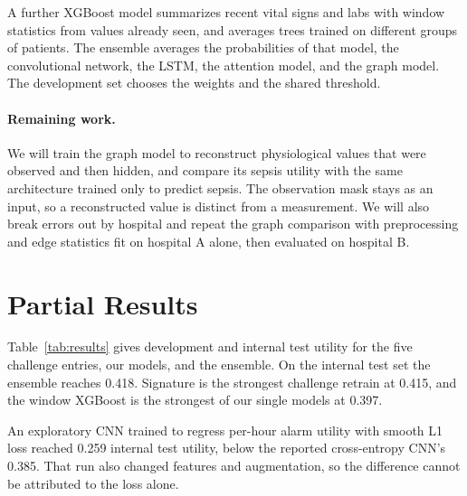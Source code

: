 \documentclass{article}
\begin{document}
A further XGBoost model summarizes recent vital signs and labs with window statistics from values already seen, and averages trees trained on different groups of patients. The ensemble averages the probabilities of that model, the convolutional network, the LSTM, the attention model, and the graph model. The development set chooses the weights and the shared threshold.

\paragraph{Remaining work.}
We will train the graph model to reconstruct physiological values that were observed and then hidden, and compare its sepsis utility with the same architecture trained only to predict sepsis. The observation mask stays as an input, so a reconstructed value is distinct from a measurement. We will also break errors out by hospital and repeat the graph comparison with preprocessing and edge statistics fit on hospital A alone, then evaluated on hospital B. 

\section{Partial Results}
Table~\ref{tab:results} gives development and internal test utility for the five challenge entries, our models, and the ensemble. On the internal test set the ensemble reaches 0.418. Signature is the strongest challenge retrain at 0.415, and the window XGBoost is the strongest of our single models at 0.397.

An exploratory CNN trained to regress per-hour alarm utility with smooth L1 loss reached 0.259 internal test utility, below the reported cross-entropy CNN's 0.385. That run also changed features and augmentation, so the difference cannot be attributed to the loss alone.
\end{document}
